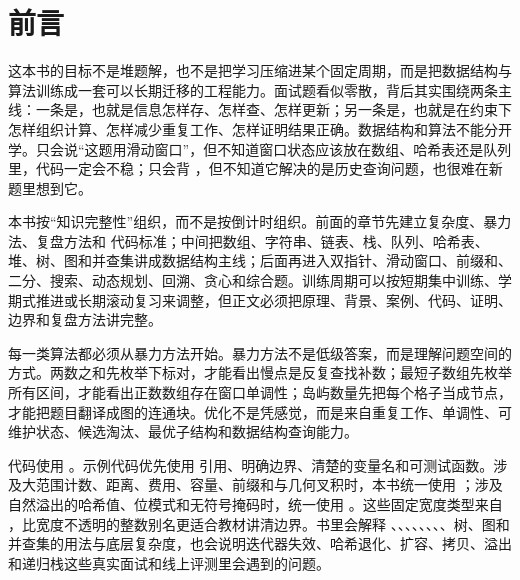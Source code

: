 \chapter*{前言}

这本书的目标不是堆题解，也不是把学习压缩进某个固定周期，而是把数据结构与算法训练成一套可以长期迁移的工程能力。面试题看似零散，背后其实围绕两条主线：一条是，也就是信息怎样存、怎样查、怎样更新；另一条是，也就是在约束下怎样组织计算、怎样减少重复工作、怎样证明结果正确。数据结构和算法不能分开学。只会说“这题用滑动窗口”，但不知道窗口状态应该放在数组、哈希表还是队列里，代码一定会不稳；只会背 ，但不知道它解决的是历史查询问题，也很难在新题里想到它。

本书按“知识完整性”组织，而不是按倒计时组织。前面的章节先建立复杂度、暴力法、复盘方法和 \cpp 代码标准；中间把数组、字符串、链表、栈、队列、哈希表、堆、树、图和并查集讲成数据结构主线；后面再进入双指针、滑动窗口、前缀和、二分、搜索、动态规划、回溯、贪心和综合题。训练周期可以按短期集中训练、学期式推进或长期滚动复习来调整，但正文必须把原理、背景、案例、代码、证明、边界和复盘方法讲完整。

每一类算法都必须从暴力方法开始。暴力方法不是低级答案，而是理解问题空间的方式。两数之和先枚举下标对，才能看出慢点是反复查找补数；最短子数组先枚举所有区间，才能看出正数数组存在窗口单调性；岛屿数量先把每个格子当成节点，才能把题目翻译成图的连通块。优化不是凭感觉，而是来自重复工作、单调性、可维护状态、候选淘汰、最优子结构和数据结构查询能力。

代码使用 。示例代码优先使用  引用、明确边界、清楚的变量名和可测试函数。涉及大范围计数、距离、费用、容量、前缀和与几何叉积时，本书统一使用 ；涉及自然溢出的哈希值、位模式和无符号掩码时，统一使用 。这些固定宽度类型来自 ，比宽度不透明的整数别名更适合教材讲清边界。书里会解释 、、、、、、、、树、图和并查集的用法与底层复杂度，也会说明迭代器失效、哈希退化、扩容、拷贝、溢出和递归栈这些真实面试和线上评测里会遇到的问题。
